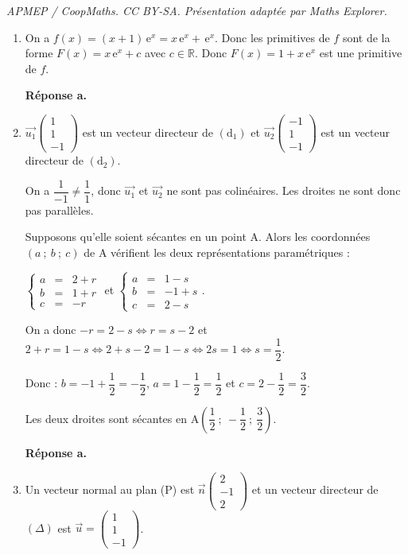 \documentclass[10pt]{article}
\providecommand{\vect}[1]{\overrightarrow{#1}}
\begin{document}
\noindent\textit{APMEP / CoopMaths. CC BY-SA. Présentation adaptée par Maths Explorer.}\par\medskip
\begin{enumerate}
	\item On a $f(x) = (x+1)\,\text{e}^{x} = x\,\text{e}^{x} + \,\text{e}^{x}$. Donc les primitives de $f$ sont de la forme $F(x) = x\,\text{e}^{x} + c$ avec $c \in \mathbb{R}$. Donc $F(x) = 1 + x\,\text{e}^{x}$ est une primitive de $f$.
	
	\textbf{Réponse a.}
	\item $\vect{u_1} \begin{pmatrix}1\\1\\-1\end{pmatrix}$ est un vecteur directeur de $\left(\text{d}_1\right)$ et $\vect{u_2} \begin{pmatrix}-1\\1\\-1\end{pmatrix}$ est un vecteur directeur de $\left(\text{d}_2\right)$.
	
On a $\dfrac{1}{-1} \neq \dfrac{1}{1}$, donc $\vect{u_1}$ et $\vect{u_2}$ ne sont pas colinéaires. Les droites ne sont donc pas parallèles.
	
Supposons qu'elle soient sécantes en un point A. Alors les coordonnées $(a~;~b~;~c)$ de A vérifient les deux représentations paramétriques :
	
$\left\{\begin{array}{rcl}a &=& 2 + r \\ b &=& 1 + r \\ c &=& -r\end{array}\right.$ et $\left\{\begin{array}{rcl}a &=& 1 - s \\ b &=& -1 + s \\ c &=& 2 - s\end{array}\right.$.
	
On a donc $-r = 2 - s \iff r = s - 2$ et $2 + r = 1 - s \iff 2 + s - 2 = 1 - s \iff 2s = 1 \iff s = \dfrac{1}{2}$.
	
Donc : $b = -1 + \dfrac{1}{2} = -\dfrac{1}{2}$, $a = 1 - \dfrac{1}{2} = \dfrac{1}{2}$ et $c = 2 - \dfrac{1}{2} = \dfrac{3}{2}$.
	
Les deux droites sont sécantes en $\text{A}\left(\dfrac{1}{2}~;~-\dfrac{1}{2}~;~\dfrac{3}{2}\right)$.
	
	\textbf{Réponse a.}
	\item Un vecteur normal au plan (P) est $\vect{n} \begin{pmatrix}2\\-1\\2\end{pmatrix}$ et un vecteur directeur de $(\Delta)$ est $\vect{u} = \begin{pmatrix}1\\1\\-1\end{pmatrix}$.
	

\end{enumerate}
\end{document}
